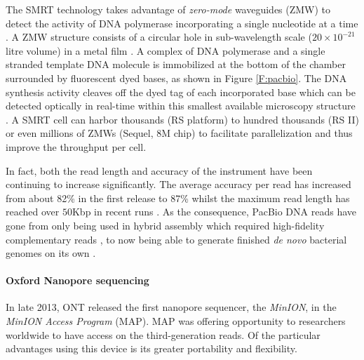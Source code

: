 The SMRT technology takes advantage of \emph{zero-mode} waveguides (ZMW) to detect the activity of DNA polymerase incorporating a single nucleotide at a time \cite{Rhoads2015}. 
A ZMW structure consists of a circular hole in sub-wavelength scale ($20\times10^{-21}$ litre volume) in a metal film \cite{Korlach2008selective}. A complex of DNA polymerase and a single stranded template DNA molecule is immobilized at the bottom of the chamber surrounded by fluorescent dyed bases, as shown in Figure \ref{F:pacbio}. The DNA synthesis activity cleaves off the dyed tag of each incorporated base which can be detected optically in real-time within this smallest available microscopy structure \cite{Levene2003zero}. A SMRT cell can harbor thousands (RS platform) to hundred thousands (RS II) or even millions of ZMWs (Sequel, 8M chip) to facilitate parallelization and thus improve the throughput per cell. 

In fact, both the read length and accuracy of the instrument have been continuing to increase significantly. The average accuracy per read has increased from about 82\% in the first release to 87\% \cite{Eid2009,Koren2013} whilst the maximum read length has reached over $50$Kbp in recent runs \cite{Berlin2015}. 
As the consequence, PacBio DNA reads have gone from only being used in hybrid assembly which required high-fidelity complementary reads \cite{KorenSW2012, Ribeiro2012}, to now being able to generate finished \emph{de novo} bacterial genomes on its own \cite{Koren2013}.

\paragraph{Oxford Nanopore sequencing} 
In late 2013, ONT released the first nanopore sequencer, the \emph{MinION}, in the \emph{MinION Access Program} (MAP).
MAP was offering opportunity to researchers worldwide to have access on the third-generation reads. 
Of the particular advantages using this device is its greater portability and flexibility.

